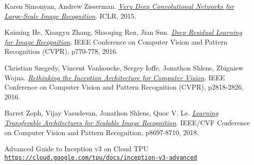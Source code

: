 \begin{thebibliography}{9}
	\hypertarget{SimonyanKarenZissermanAndrew}{} 
	Karen Simonyan, Andrew Zisserman.
	\textit{\href{https://arxiv.org/pdf/1409.1556.pdf}{Very Deep Convolutional Networks for Large-Scale Image Recognition}}.
	 ICLR, 2015.
	 
	\hypertarget{KaimingHeXiangyuZhangShaoqingRenJianSun}{} 
	Kaiming He, Xiangyu Zhang, Shaoqing Ren, Jian Sun.
	\textit{\href{https://arxiv.org/pdf/1512.03385.pdf}{Deep Residual Learning for Image Recognition}}.
	 IEEE Conference on Computer Vision and Pattern Recognition (CVPR), p770-778, 2016.

	\hypertarget{Szegedy2016RethinkingTI}{} 
	Christian Szegedy, Vincent Vanhoucke, Sergey Ioffe, Jonathon Shlens, Zbigniew Wojna.
	\textit{\href{https://arxiv.org/pdf/1512.00567.pdf}{Rethinking the Inception Architecture for Computer Vision}}.
	 IEEE Conference on Computer Vision and Pattern Recognition (CVPR), p2818-2826, 2016.	
	
	\hypertarget{Zoph2018LearningTA}{} 
	Barret Zoph, Vijay Vasudevan, Jonathon Shlens, Quoc V. Le.
	\textit{\href{https://arxiv.org/pdf/1707.07012.pdf}{Learning Transferable Architectures for Scalable Image Recognition}}.
	 IEEE/CVF Conference on Computer Vision and Pattern Recognition, p8697-8710, 2018.	
	
	\hypertarget{guideinceptionv3}{} 
	Advanced Guide to Inception v3 on Cloud TPU
	\\\texttt{\url{https://cloud.google.com/tpu/docs/inception-v3-advanced}}

\end{thebibliography}
